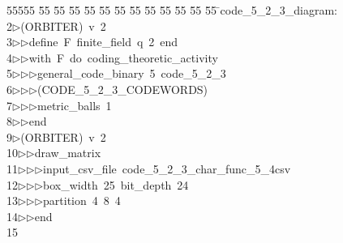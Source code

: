 %
%
\begin{tabbing}
55555 \= 55 \= 55 \= 55 \= 55 \= 55 \= 55 \= 55 \= 55 \= 55 \= 55 \= 55 \= 55 \= \>code\_5\_2\_3\_diagram:\\[0pt]
2\>$\triangleright$\>(ORBITER)\ v\ 2\ \\[0pt]
3\>$\triangleright$\>$\triangleright$\>define\ F\ finite\_field\ q\ 2\ end\ \\[0pt]
4\>$\triangleright$\>$\triangleright$\>with\ F\ do\ coding\_theoretic\_activity\ \\[0pt]
5\>$\triangleright$\>$\triangleright$\>$\triangleright$\>general\_code\_binary\ 5\ code\_5\_2\_3\ \\[0pt]
6\>$\triangleright$\>$\triangleright$\>$\triangleright$\>(CODE\_5\_2\_3\_CODEWORDS)\ \\[0pt]
7\>$\triangleright$\>$\triangleright$\>$\triangleright$\>metric\_balls\ 1\ \\[0pt]
8\>$\triangleright$\>$\triangleright$\>end\\[0pt]
9\>$\triangleright$\>(ORBITER)\ v\ 2\ \\[0pt]
10\>$\triangleright$\>$\triangleright$\>draw\_matrix\ \\[0pt]
11\>$\triangleright$\>$\triangleright$\>$\triangleright$\>input\_csv\_file\ code\_5\_2\_3\_char\_func\_5\_4csv\ \\[0pt]
12\>$\triangleright$\>$\triangleright$\>$\triangleright$\>box\_width\ 25\ bit\_depth\ 24\ \\[0pt]
13\>$\triangleright$\>$\triangleright$\>$\triangleright$\>partition\ 4\ 8\ 4\ \\[0pt]
14\>$\triangleright$\>$\triangleright$\>end\\[0pt]
15\>\end{tabbing}
